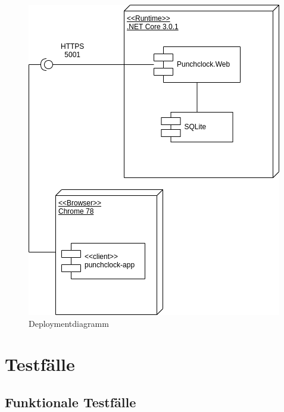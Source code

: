 \documentclass[a4paper, titlepage]{article}
\begin{document}
    \begin{figure}
        \includegraphics[width=\textwidth]{images/Deploymentdiagramm.png}
        \caption{Deploymentdiagramm}
        \label{deployment}
    \end{figure}

    \section{Testfälle}
    \subsection{Funktionale Testfälle}
\end{document}
